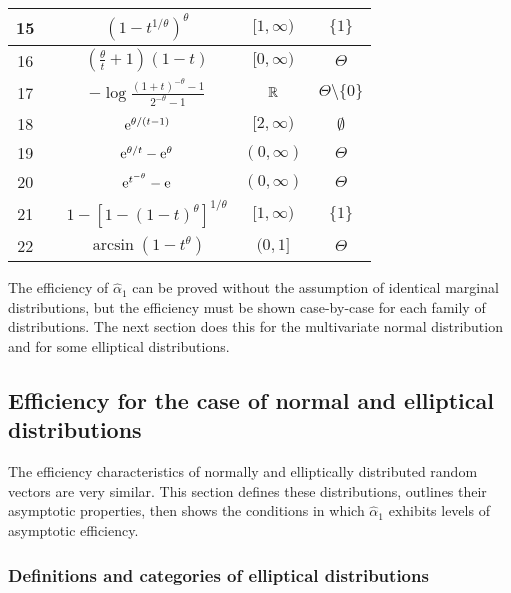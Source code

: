 \begin{table}
{\begin{tabular}{|c|c|c|c|c|}
\hline
15 & \cellcolor{lightgray} & $(1 - t^{1/\theta})^\theta$ & $[1, \infty)$ & $\{1\}$ \\[3pt]
\hline
16 & \cellcolor{lightgray} & $(\frac{\theta}{t} + 1)(1-t)$ & $[0, \infty)$ & $\Theta$ \\[3pt]
\hline
17 & \cellcolor{lightgray} & $-\log \frac{(1+t)^{-\theta}-1}{2^{-\theta} - 1}$ & $\mathbb{R}$ & $\Theta \setminus \{0\}$ \\[3pt]
\hline
18 & \cellcolor{lightgray} & $\mathrm{e}^{\theta/(t-1)}$ & $[2, \infty)$ & $\emptyset$ \\[3pt]
\hline
19 & \cellcolor{lightgray} & $\mathrm{e}^{\theta/t} - \mathrm{e}^{\theta}$ & $(0, \infty)$ & $\Theta$ \\[3pt]
\hline
20 & \cellcolor{lightgray} & $\mathrm{e}^{t^{-\theta}} - \mathrm{e}$ & $(0, \infty)$ & $\Theta$ \\[3pt]
\hline
21 & \cellcolor{lightgray} & $1 - [1 - (1-t)^\theta]^{1/\theta}$ & $[1, \infty)$ & $\{1\}$ \\[3pt]
\hline
22 & \cellcolor{lightgray} & $\arcsin(1-t^\theta)$ & $(0, 1]$ & $\Theta$ \\[3pt]
\hline
\end{tabular}}
\end{table}

The efficiency of $\hat{\alpha}_1$ can be proved without the assumption of identical marginal distributions, but the efficiency must be shown case-by-case for each family of distributions. The next section does this for the multivariate normal distribution and for some elliptical distributions.

\subsection{Efficiency for the case of normal and elliptical distributions} \label{scn:elliptical}

The efficiency characteristics of normally and elliptically distributed random vectors are very similar. This section defines these distributions, outlines their asymptotic properties, then shows the conditions in which $\hat{\alpha}_1$ exhibits levels of asymptotic efficiency.

\subsubsection{Definitions and categories of elliptical distributions}

